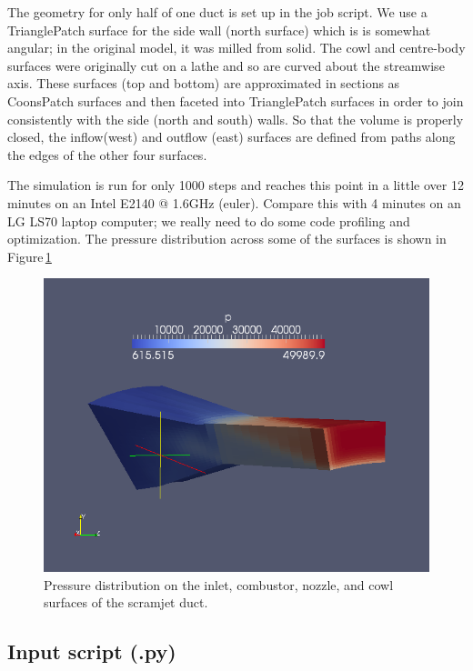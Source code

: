 \medskip
The geometry for only half of one duct is set up in the job script.
We use a TrianglePatch surface for the side wall (north surface) which is is
somewhat angular; in the original model, it was milled from solid.
The cowl and centre-body surfaces were originally cut on a lathe and so are
curved about the streamwise axis.
These surfaces (top and bottom) are approximated in sections as 
CoonsPatch surfaces and then faceted into TrianglePatch surfaces in order to
join consistently with the side (north and south) walls.
So that the volume is properly closed, the inflow(west) and outflow (east)
surfaces are defined from paths along the edges of the other four surfaces.

\medskip
The simulation is run for only 1000 steps and reaches this point in
a little over 12 minutes on an Intel E2140 @ 1.6GHz (euler).
Compare this with 4 minutes on an LG LS70 laptop computer; we really need to do some
code profiling and optimization.
The pressure distribution across some of the surfaces is shown in Figure\,\ref{scram1-p-fig}

\begin{figure}[htbp]
\begin{center}
\includegraphics[width=12cm]{../3D/scramjet-1/scram1-p-field.png}
\end{center}
\caption{Pressure distribution on the inlet, combustor, nozzle, and cowl 
  surfaces of the scramjet duct.}
\label{scram1-p-fig}
\end{figure}

\newpage
\subsection{Input script (.py)}
\topbar

\bottombar
